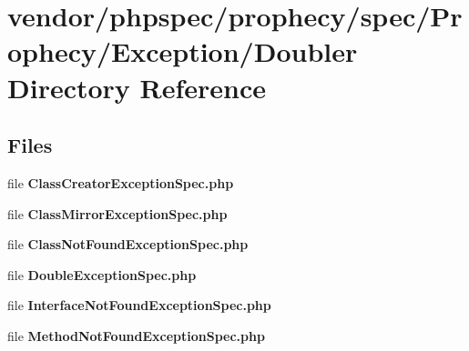 \section{vendor/phpspec/prophecy/spec/\+Prophecy/\+Exception/\+Doubler Directory Reference}
\label{dir_6e6d556b070325af926c5831363d0b9e}
\subsection*{Files}
\begin{DoxyCompactItemize}
\item 
file {\bf Class\+Creator\+Exception\+Spec.\+php}
\item 
file {\bf Class\+Mirror\+Exception\+Spec.\+php}
\item 
file {\bf Class\+Not\+Found\+Exception\+Spec.\+php}
\item 
file {\bf Double\+Exception\+Spec.\+php}
\item 
file {\bf Interface\+Not\+Found\+Exception\+Spec.\+php}
\item 
file {\bf Method\+Not\+Found\+Exception\+Spec.\+php}
\end{DoxyCompactItemize}
